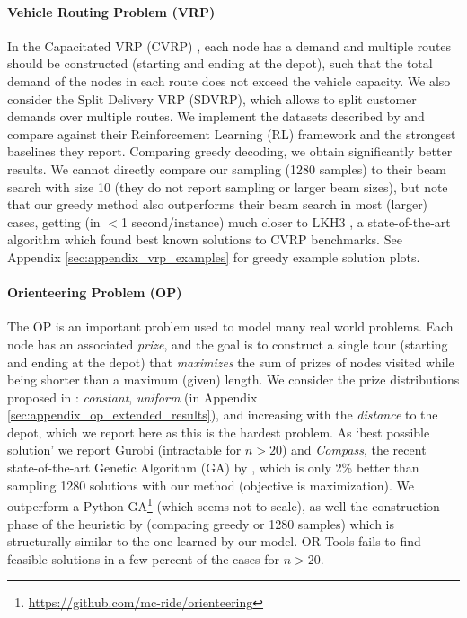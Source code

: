 \paragraph{Vehicle Routing Problem (VRP)}
In the Capacitated VRP (CVRP) \citep{toth2014vehicle}, each node has a demand and multiple routes should be constructed (starting and ending at the depot), such that the total demand of the nodes in each route does not exceed the vehicle capacity. We also consider the Split Delivery VRP (SDVRP), which allows to split customer demands over multiple routes. We implement the datasets described by \citet{nazari2018reinforcement} and compare against their Reinforcement Learning (RL) framework and the strongest baselines they report. Comparing greedy decoding, we obtain significantly better results. We cannot directly compare our sampling (1280 samples) to their beam search with size 10 (they do not report sampling or larger beam sizes), but note that our greedy method also outperforms their beam search in most (larger) cases, getting (in $<$1 second/instance) much closer to LKH3 \citep{helsgaun2017extension}, a state-of-the-art algorithm which found best known solutions to CVRP benchmarks. See Appendix \ref{sec:appendix_vrp_examples} for greedy example solution plots.

\paragraph{Orienteering Problem (OP)}
The OP \citep{golden1987orienteering} is an important problem used to model many real world problems. Each node has an associated \emph{prize}, and the goal is to construct a single tour (starting and ending at the depot) that \emph{maximizes} the sum of prizes of nodes visited while being shorter than a maximum (given) length. We consider the prize distributions proposed in \citet{fischetti1998solving}: \emph{constant}, \emph{uniform} (in Appendix \ref{sec:appendix_op_extended_results}), and increasing with the \emph{distance} to the depot, which we report here as this is the hardest problem. As `best possible solution' we report Gurobi (intractable for $n > 20$) and \emph{Compass}, the recent state-of-the-art Genetic Algorithm (GA) by \citet{kobeaga2018efficient}, which is only 2\% better than sampling 1280 solutions with our method (objective is maximization). We outperform a Python GA\footnote{\url{https://github.com/mc-ride/orienteering}} (which seems not to scale), as well the construction phase of the heuristic by \citet{tsiligirides1984heuristic} (comparing greedy or 1280 samples) which is structurally similar to the one learned by our model. OR Tools fails to find feasible solutions in a few percent of the cases for $n > 20$.

